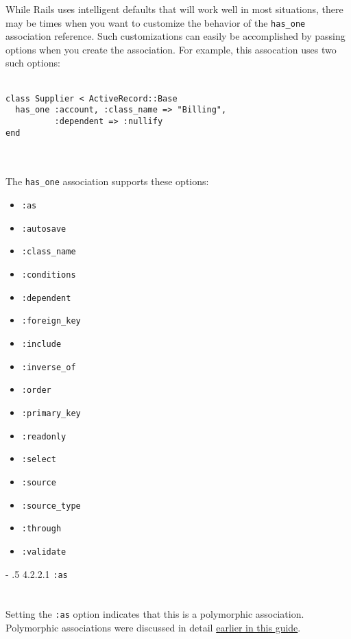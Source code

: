 \documentclass[10pt]{book}
\makeatletter
\renewcommand\paragraph{%
   \@startsection{paragraph}{4}{0mm}%
      {-\baselineskip}%
      {.5\baselineskip}%
      {\normalfont\scriptsize\bfseries}}
\makeatother
\begin{document}
While Rails uses intelligent defaults that will work well in most  situations, there may be times when you want to customize the behavior  of the \texttt{has\_one} association reference. Such customizations can  easily be accomplished by passing options when you create the  association. For example, this assocation uses two such options:
\\ \\
\begin{minipage}{\textwidth}{\scriptsize
\begin{verbatim}
class Supplier < ActiveRecord::Base
  has_one :account, :class_name => "Billing",
          :dependent => :nullify
end
\end{verbatim}}
\end{minipage}
\\ \\

The \texttt{has\_one} association supports these options:
\begin{itemize}
	\item \texttt{:as}
	\item \texttt{:autosave}
	\item \texttt{:class\_name}
	\item \texttt{:conditions}
	\item \texttt{:dependent}
	\item \texttt{:foreign\_key}
	\item \texttt{:include}
	\item \texttt{:inverse\_of}
	\item \texttt{:order}
	\item \texttt{:primary\_key}
	\item \texttt{:readonly}
	\item \texttt{:select}
	\item \texttt{:source}
	\item \texttt{:source\_type}
	\item \texttt{:through}
	\item \texttt{:validate}
\end{itemize}

\paragraph{4.2.2.1 \texttt{:as}}\\ \\\\

Setting the \texttt{:as} option indicates that this is a polymorphic association. Polymorphic associations were discussed in detail \hyperlink{polymorphic-associations}{earlier in this guide}.
\end{document}
